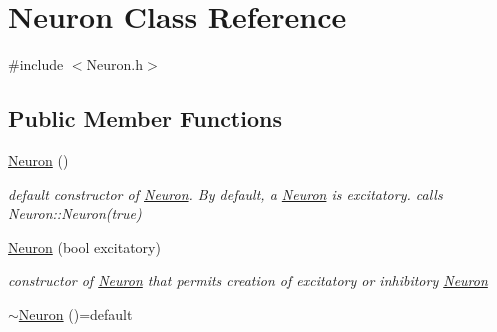 \hypertarget{classNeuron}{}\section{Neuron Class Reference}
\label{classNeuron}


{\ttfamily \#include $<$Neuron.\+h$>$}

\subsection*{Public Member Functions}
\begin{DoxyCompactItemize}
\item 
\hyperlink{classNeuron_a823487d01615fadb8ac19a2768dd9d96}{Neuron} ()
\begin{DoxyCompactList}\small\item\em default constructor of \hyperlink{classNeuron}{Neuron}. By default, a \hyperlink{classNeuron}{Neuron} is excitatory. calls Neuron\+::\+Neuron(true) \end{DoxyCompactList}\item 
\hyperlink{classNeuron_af1ec9cf091aa834daf3078d02e2ad75a}{Neuron} (bool excitatory)
\begin{DoxyCompactList}\small\item\em constructor of \hyperlink{classNeuron}{Neuron} that permits creation of excitatory or inhibitory \hyperlink{classNeuron}{Neuron} \end{DoxyCompactList}\item 
\hyperlink{classNeuron_a7350045966914cd4bcddac6706e7d864}{$\sim$\+Neuron} ()=default\hypertarget{classNeuron_a7350045966914cd4bcddac6706e7d864}{}\label{classNeuron_a7350045966914cd4bcddac6706e7d864}


\end{DoxyCompactItemize}

